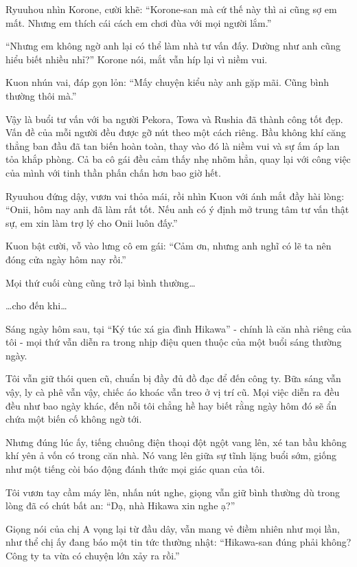 \documentclass[../main.tex]{subfiles}
\begin{document}
Ryuuhou nhìn Korone, cười khẽ: ``Korone-san mà cứ thế này thì ai cũng sợ em mất. Nhưng em thích cái cách em chơi đùa với mọi người lắm.''

``Nhưng em không ngờ anh lại có thể làm nhà tư vấn đấy. Dường như anh cũng hiểu biết nhiều nhỉ?'' Korone nói, mắt vẫn híp lại vì niềm vui.

Kuon nhún vai, đáp gọn lỏn: ``Mấy chuyện kiểu này anh gặp mãi. Cũng bình thường thôi mà.''

Vậy là buổi tư vấn với ba người Pekora, Towa và Rushia đã thành công tốt đẹp. Vấn đề của mỗi người đều được gỡ nút theo một cách riêng. Bầu không khí căng thẳng ban đầu đã tan biến hoàn toàn, thay vào đó là niềm vui và sự ấm áp lan tỏa khắp phòng. Cả ba cô gái đều cảm thấy nhẹ nhõm hẳn, quay lại với công việc của mình với tinh thần phấn chấn hơn bao giờ hết.

Ryuuhou đứng dậy, vươn vai thỏa mái, rồi nhìn Kuon với ánh mắt đầy hài lòng: ``Onii, hôm nay anh đã làm rất tốt. Nếu anh có ý định mở trung tâm tư vấn thật sự, em xin làm trợ lý cho Onii luôn đấy.''

Kuon bật cười, vỗ vào lưng cô em gái: ``Cảm ơn, nhưng anh nghĩ có lẽ ta nên đóng cửa ngày hôm nay rồi.''

Mọi thứ cuối cùng cũng trở lại bình thường\dots

\dots cho đến khi\dots

\il



Sáng ngày hôm sau, tại ``Ký túc xá gia đình Hikawa'' - chính là căn nhà riêng của tôi - mọi thứ vẫn diễn ra trong nhịp điệu quen thuộc của một buổi sáng thường ngày.

Tôi vẫn giữ thói quen cũ, chuẩn bị đầy đủ đồ đạc để đến công ty. Bữa sáng vẫn vậy, ly cà phê vẫn vậy, chiếc áo khoác vẫn treo ở vị trí cũ. Mọi việc diễn ra đều đều như bao ngày khác, đến nỗi tôi chẳng hề hay biết rằng ngày hôm đó sẽ ẩn chứa một biến cố không ngờ tới.

Nhưng đúng lúc ấy, tiếng chuông điện thoại đột ngột vang lên, xé tan bầu không khí yên ả vốn có trong căn nhà. Nó vang lên giữa sự tĩnh lặng buổi sớm, giống như một tiếng còi báo động đánh thức mọi giác quan của tôi.

Tôi vươn tay cầm máy lên, nhấn nút nghe, giọng vẫn giữ bình thường dù trong lòng đã có chút bất an: ``Dạ, nhà Hikawa xin nghe ạ?''

Giọng nói của chị A vọng lại từ đầu dây, vẫn mang vẻ điềm nhiên như mọi lần, như thể chị ấy đang báo một tin tức thường nhật: ``Hikawa-san đúng phải không? Công ty ta vừa có chuyện lớn xảy ra rồi.''
\end{document}
